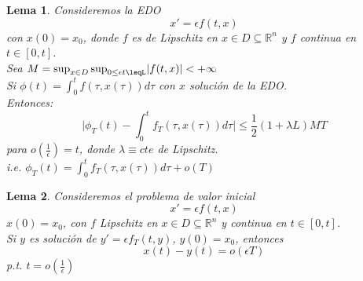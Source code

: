 \documentclass[12pt, a4paper]{report}
\providecommand{\abs}[1]{\lvert#1\rvert}
\newtheorem{lemma}{Lema}
\begin{document}
\newpage


\begin{lemma}
	Consideremos la EDO
	$$
		x'=\epsilon f(t,x)
	$$
	con $x(0)=x_0$, donde $f$ es de Lipschitz en $x\in D\subseteq\mathbb{R}^n$
	y $f$ continua en $t\in[0,t]$.\\
	Sea $M=\sup_{x\in D} \sup_{0\leq\epsilon t\leqL} \abs{f(t,x)}<+\infty$
	\\Si $\phi(t)=\int_{0}^{t}f(\tau,x(\tau))d\tau$ con $x$ solución de la EDO.
	\\Entonces:
	$$
		\abs{\phi_T(t)-\int_{0}^{t}f_T(\tau,x(\tau))d\tau}\leq\frac{1}{2}(1+\lambda L)MT
	$$
	para $o(\frac{1}{\epsilon})=t$, donde $\lambda\equiv cte$ de Lipschitz.
	\\i.e. $\phi_T(t)=\int_{0}^{t}f_T(\tau,x(\tau))d\tau+o(T)$
\end{lemma}

\begin{lemma}
	Consideremos el problema de valor inicial
	$$
		x'=\epsilon f(t,x)
	$$
	$x(0)=x_0$, con $f$ Lipschitz en $x\in D\subseteq\mathbb{R}^n$ y continua
	en $t\in[0,t]$. \\
	Si $y$ es solución de $y'=\epsilon f_T(t,y)$, $y(0)=x_0$, entonces
	$$
		x(t)-y(t)=o(\epsilon T)
	$$
	p.t. $t=o(\frac{1}{\epsilon})$
\end{lemma}
\end{document}
